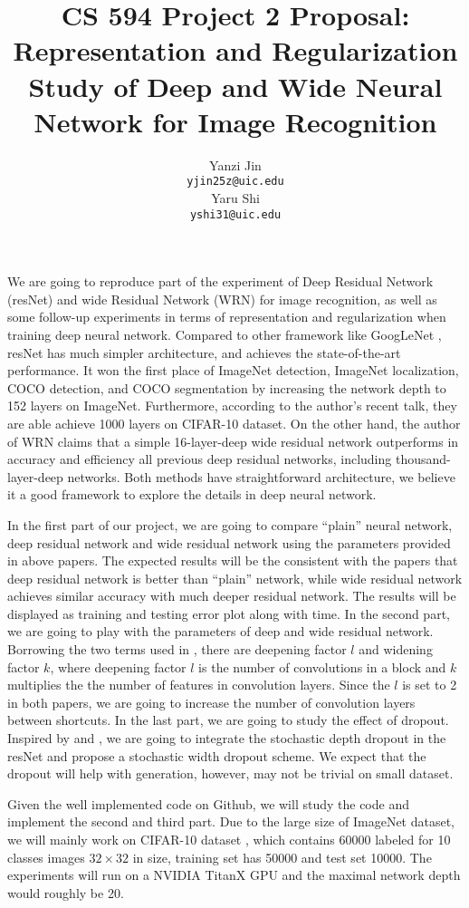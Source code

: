 \documentclass{article} %
\title{CS 594 Project 2 Proposal: Representation and Regularization Study of Deep and Wide Neural Network for Image Recognition}
\author{
Yanzi Jin \\
\texttt{yjin25z@uic.edu} \\
\And
Yaru Shi \\
\texttt{yshi31@uic.edu} \\
}
\begin{document}
\maketitle

We are going to reproduce part of the experiment of Deep Residual Network (resNet) \cite{he2015deep} and wide Residual Network (WRN) \cite{zagoruyko2016wide} for image recognition, as well as some follow-up experiments in terms of representation and regularization when training deep neural network. Compared to other framework like GoogLeNet \cite{szegedy2015going}, resNet has much simpler architecture, and achieves the state-of-the-art performance. It won the first place of ImageNet detection, ImageNet localization, COCO detection, and COCO segmentation by increasing the network depth to 152 layers on ImageNet. Furthermore, according to the author's recent talk, they are able achieve 1000 layers on CIFAR-10 dataset. On the other hand, the author of WRN claims that a simple 16-layer-deep wide residual network outperforms in accuracy and efficiency all previous deep residual networks, including thousand-layer-deep networks. Both methods have straightforward architecture, we believe it a good framework to explore the details in deep neural network. 

In the first part of our project, we are going to compare ``plain'' neural network, deep residual network and wide residual network using the parameters provided in above papers. The expected results will be the consistent with the papers that deep residual network is better than ``plain'' network, while wide residual network achieves similar accuracy with much deeper residual network. The results will be displayed as training and testing error plot along with time. In the second part, we are going to play with the parameters of deep and wide residual network. Borrowing the two terms used in \cite{zagoruyko2016wide}, there are deepening factor $l$ and widening factor $k$, where deepening factor $l$ is the number of convolutions in a block and $k$ multiplies the the number of features in convolution layers. Since the $l$ is set to 2 in both papers, we are going to increase the number of convolution layers between shortcuts. In the last part, we are going to study the effect of dropout. Inspired by \cite{he2016identity} and \cite{DBLP:journals/corr/HuangSLSW16}, we are going to integrate the stochastic depth dropout in the resNet and propose a stochastic width dropout scheme. We expect that the dropout will help with generation, however, may not be trivial on small dataset.

Given the well implemented code on Github, we will study the code and implement the second and third part. Due to the large size of ImageNet dataset, we will mainly work on CIFAR-10 dataset \cite{krizhevsky2009learning}, which contains 60000 labeled for 10 classes images $32\times32$ in size, training set has 50000 and test set 10000. The experiments will run on a NVIDIA TitanX GPU and the maximal network depth would roughly be 20. 


 
\end{document}
